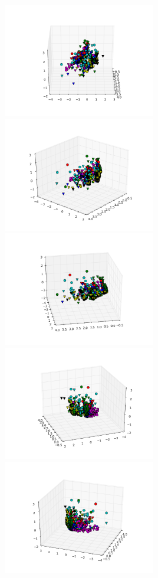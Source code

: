 \includegraphics[width=0.5\textwidth]{img/ej1_sanger_01_20}
\includegraphics[width=0.5\textwidth]{img/ej1_sanger_01_40}
\includegraphics[width=0.5\textwidth]{img/ej1_sanger_01_80}
\includegraphics[width=0.5\textwidth]{img/ej1_sanger_01_160}
\includegraphics[width=0.5\textwidth]{img/ej1_sanger_01_200}

